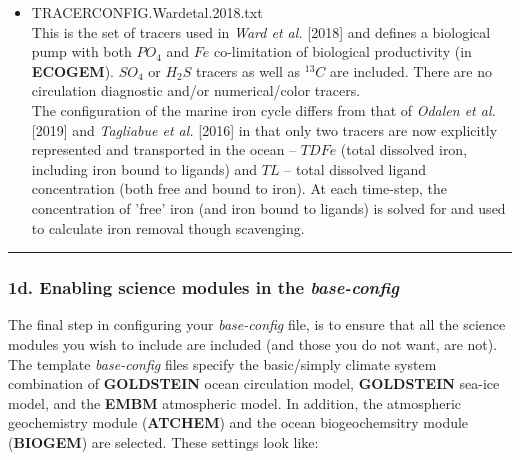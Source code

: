 \begin{itemize}[noitemsep]
\vspace{2mm}
\item \textsf{\small TRACERCONFIG.Wardetal.2018.txt}
\vspace{1mm}
\\This is the set of tracers used in \textit{Ward et al.} [2018] and defines a biological pump with both \(PO_{4}\) and \(Fe\) co-limitation of biological productivity (in \textbf{ECOGEM}). \(SO_{4}\) or \(H_{2}S\) tracers as well as \(^{13}C\) are included. There are no circulation diagnostic and/or numerical/color tracers.
\\The configuration of the marine iron cycle differs from that of \textit{Odalen et al.} [2019] and \textit{Tagliabue et al.} [2016] in that only two tracers are now explicitly represented and transported in the ocean -- \(TDFe\) (total dissolved iron, including iron bound to ligands) and \(TL\) -- total dissolved ligand concentration (both free and bound to iron). At each time-step, the concentration of 'free' iron (and iron bound to ligands) is solved for and used to calculate iron removal though scavenging.

\end{itemize}

\vspace{1mm}\noindent\rule{4cm}{0.5pt}\vspace{2mm}

\newpage 

\subsubsection{1d. Enabling science modules in the \textit{base-config}}

The final step in configuring your \textit{base-config} file, is to ensure that all the science modules you wish to include are included (and those you do not want, are not). The template \textit{base-config} files specify the basic/simply climate system combination of \textbf{GOLDSTEIN} ocean circulation model, \textbf{GOLDSTEIN} sea-ice model, and the \textbf{EMBM} atmospheric model. In addition, the atmospheric geochemistry module (\textbf{ATCHEM}) and the ocean biogeochemsitry module (\textbf{BIOGEM}) are selected. These settings look like:

